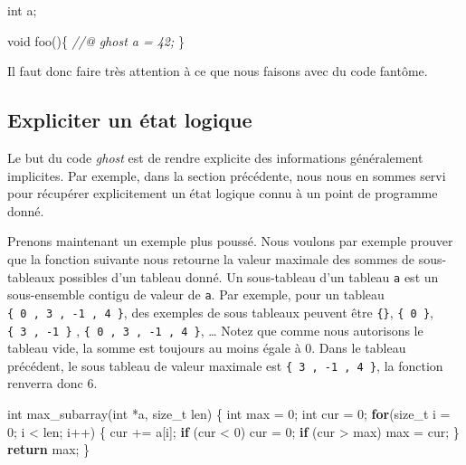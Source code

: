 \documentclass[12pt,francais,]{scrbook}
\newenvironment{Shaded}{}{}
\newcommand{\KeywordTok}[1]{\textcolor[rgb]{0.00,0.44,0.13}{\textbf{{#1}}}}
\newcommand{\DataTypeTok}[1]{\textcolor[rgb]{0.56,0.13,0.00}{{#1}}}
\newcommand{\DecValTok}[1]{\textcolor[rgb]{0.25,0.63,0.44}{{#1}}}
\newcommand{\CommentTok}[1]{\textcolor[rgb]{0.38,0.63,0.69}{\textit{{#1}}}}
\newcommand{\NormalTok}[1]{{#1}}
\begin{document}
\begin{footnotesize}\begin{Shaded}
\begin{Highlighting}[]
\DataTypeTok{int} \NormalTok{a;}

\DataTypeTok{void} \NormalTok{foo()\{}
  \CommentTok{//@ ghost a = 42;}
\NormalTok{\}}
\end{Highlighting}
\end{Shaded}\end{footnotesize}

Il faut donc faire très attention à ce que nous faisons avec du code
fantôme.

\subsection{Expliciter un état
logique}\label{expliciter-un-uxe9tat-logique}

Le but du code \emph{ghost} est de rendre explicite des informations
généralement implicites. Par exemple, dans la section précédente, nous
nous en sommes servi pour récupérer explicitement un état logique connu
à un point de programme donné.

Prenons maintenant un exemple plus poussé. Nous voulons par exemple
prouver que la fonction suivante nous retourne la valeur maximale des
sommes de sous-tableaux possibles d'un tableau donné. Un sous-tableau
d'un tableau \texttt{a} est un sous-ensemble contigu de valeur de
\texttt{a}. Par exemple, pour un tableau
\texttt{\{\ 0\ ,\ 3\ ,\ -1\ ,\ 4\ \}}, des exemples de sous tableaux
peuvent être \texttt{\{\}}, \texttt{\{\ 0\ \}},
\texttt{\{\ 3\ ,\ -1\ \}} , \texttt{\{\ 0\ ,\ 3\ ,\ -1\ ,\ 4\ \}},
\ldots{} Notez que comme nous autorisons le tableau vide, la somme est
toujours au moins égale à 0. Dans le tableau précédent, le sous tableau
de valeur maximale est \texttt{\{\ 3\ ,\ -1\ ,\ 4\ \}}, la fonction
renverra donc 6.

\begin{footnotesize}\begin{Shaded}
\begin{Highlighting}[]
\DataTypeTok{int} \NormalTok{max_subarray(}\DataTypeTok{int} \NormalTok{*a, size_t len) \{}
  \DataTypeTok{int} \NormalTok{max = }\DecValTok{0}\NormalTok{;}
  \DataTypeTok{int} \NormalTok{cur = }\DecValTok{0}\NormalTok{;}
  \KeywordTok{for}\NormalTok{(size_t i = }\DecValTok{0}\NormalTok{; i < len; i++) \{}
    \NormalTok{cur += a[i];}
    \KeywordTok{if} \NormalTok{(cur < }\DecValTok{0}\NormalTok{)   cur = }\DecValTok{0}\NormalTok{;}
    \KeywordTok{if} \NormalTok{(cur > max) max = cur;}
  \NormalTok{\}}
  \KeywordTok{return} \NormalTok{max;}
\NormalTok{\}}
\end{Highlighting}
\end{Shaded}\end{footnotesize}
\end{document}
